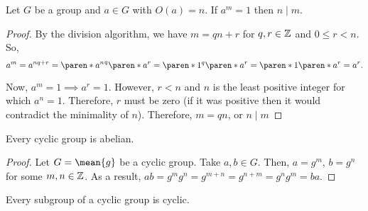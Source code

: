 \documentclass[11pt]{penrose}
\newcommand{\cyclic}[1]{\mean{#1}}
\begin{document}
\begin{nthm}
    Let $G$ be a group and $a \in G$ with $O(a) = n$. If $a^m = 1$ then $n \mid m$.
\end{nthm}
\begin{proof}
    By the division algorithm, we have $m = qn + r$ for $q, r \in \mathbb{Z}$ and $0 \leq r < n$. So,
    \begin{equation*}
        a^m = a^{nq + r} = \paren*{{a^n}^q} \paren*{a^r} = \paren*{1^q} \paren*{a^r} = \paren*{1} \paren*{a^r} = a^r.
    \end{equation*}

    Now, $a^m = 1 \implies a^r = 1$. However, $r < n$ and $n$ is the least positive integer for which $a^n = 1$. Therefore, $r$ must be zero (if it was positive then it would contradict the minimality of $n$). Therefore, $m = qn$, or $n \mid m$
\end{proof}

\begin{nthm}
    Every cyclic group is abelian.
\end{nthm}
\begin{proof}
    Let $G = \cyclic{g}$ be a cyclic group. Take $a, b \in G$. Then, $a = g^m$, $b = g^n$ for some $m, n \in \mathbb{Z}$. As a result, $ab = g^m g^n = g^{m+n} = g^{n+m} = g^n g^m = ba$.
\end{proof}

\begin{nthm}
    Every subgroup of a cyclic group is cyclic.
\end{nthm}
\end{document}
